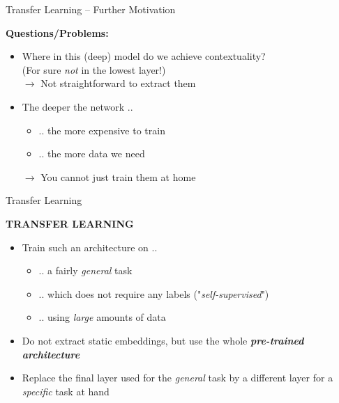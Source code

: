 \documentclass[]{beamer}
\begin{document}
\begin{frame}{Transfer Learning -- Further Motivation}

	\textbf{Questions/Problems:}

	\begin{itemize}
		\item Where in this (deep) model do we achieve contextuality?\\
					(For sure \textit{not} in the lowest layer!)\\
					$\rightarrow$ Not straightforward to extract them
		\item The deeper the network ..  \\
			\begin{itemize}
				\item .. the more expensive to train
				\item .. the more data we need 
			\end{itemize}
					$\rightarrow$ You cannot just train them at home
	\end{itemize}
\end{frame}



\begin{frame}{Transfer Learning}

	\textbf{TRANSFER LEARNING}

	\begin{itemize}
		\item Train such an architecture on ..
			\begin{itemize}
				\item .. a fairly \textit{general} task
				\item .. which does not require any labels ("\textit{self-supervised}")
				\item .. using \textit{large} amounts of data
			\end{itemize}\mbox{}
		\item Do not extract static embeddings, but use the whole \textbf{\textit{pre-trained architecture}}\\\mbox{}
		\item Replace the final layer used for the \textit{general} task by a different layer for a \textit{specific} task at hand
	\end{itemize}
\end{frame}
\end{document}
